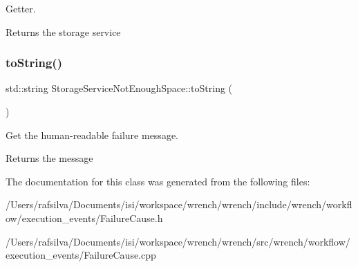 Getter. 

\begin{DoxyReturn}{Returns}
the storage service 
\end{DoxyReturn}
\mbox{\label{class_storage_service_not_enough_space_a428bbcd962cfdf20e541e2d7673a73ac}} 
\subsubsection{\texorpdfstring{to\+String()}{toString()}}
{\footnotesize\ttfamily std\+::string Storage\+Service\+Not\+Enough\+Space\+::to\+String (\begin{DoxyParamCaption}{ }\end{DoxyParamCaption})}



Get the human-\/readable failure message. 

\begin{DoxyReturn}{Returns}
the message 
\end{DoxyReturn}


The documentation for this class was generated from the following files\+:\begin{DoxyCompactItemize}
\item 
/\+Users/rafsilva/\+Documents/isi/workspace/wrench/wrench/include/wrench/workflow/execution\+\_\+events/Failure\+Cause.\+h\item 
/\+Users/rafsilva/\+Documents/isi/workspace/wrench/wrench/src/wrench/workflow/execution\+\_\+events/Failure\+Cause.\+cpp\end{DoxyCompactItemize}
